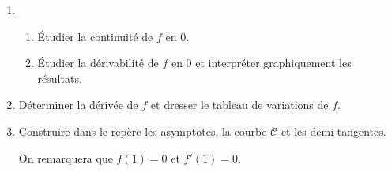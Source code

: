 \begin{enumerate}
\begin{enumerate}
 
 \item  
 \begin{enumerate}
  \item  Étudier la continuité de $ f $ en 0. 
\item  Étudier la dérivabilité de $ f $ en 0 et interpréter graphiquement les résultats. 
   \end{enumerate}

\item Déterminer la dérivée de $ f $ et dresser le tableau de variations de $ f $.  


\item Construire dans le repère les asymptotes, la courbe  $\mathscr{C}$ et les demi-tangentes.


 On remarquera que $f(1) = 0$ et $f'(1) = 0$.  
\end{enumerate}
\end{enumerate}

